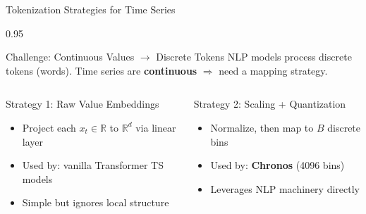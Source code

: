 \documentclass[9pt, aspectratio=169, t]{beamer}
\begin{document}
\begin{frame}{Tokenization Strategies for Time Series}
    \begin{cminipage}{0.95\textwidth}
    \vspace{-2mm}
    {\scriptsize
    \begin{block}{Challenge: Continuous Values $\to$ Discrete Tokens}
        NLP models process discrete tokens (words). Time series are \textbf{continuous} $\Rightarrow$ need a mapping strategy.
    \end{block}
    \vspace{-2mm}
    \begin{columns}[T]
        \begin{exampleblock}{Strategy 1: Raw Value Embeddings}
            \begin{itemize}\setlength{\itemsep}{0pt}
                \item Project each $x_t \in \mathbb{R}$ to $\mathbb{R}^d$ via linear layer
                \item Used by: vanilla Transformer TS models
                \item Simple but ignores local structure
            \end{itemize}
        \end{exampleblock}
        \vspace{-2mm}
        \begin{exampleblock}{Strategy 2: Scaling + Quantization}
            \begin{itemize}\setlength{\itemsep}{0pt}
                \item Normalize, then map to $B$ discrete bins
                \item Used by: \textbf{Chronos} (4096 bins)
                \item Leverages NLP machinery directly
            \end{itemize}
        \end{exampleblock}


\end{columns}}
\end{cminipage}
\end{frame}
\end{document}
